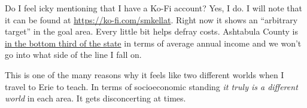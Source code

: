 Do I feel icky mentioning that I have a Ko-Fi account? Yes, I do. I will
note that it can be found at \url{https://ko-fi.com/smkellat}. Right now
it shows an ``arbitrary target'' in the goal area. Every little bit
helps defray costs. Ashtabula County is
\href{https://web.archive.org/web/20240119101143/https://www.cleveland.com/datacentral/2020/01/every-ohio-city-and-county-ranked-for-median-family-household-income-census-estimates.html}{in
the bottom third of the state} in terms of average annual income and we
won't go into what side of the line I fall on.

This is one of the many reasons why it feels like two different worlds
when I travel to Erie to teach. In terms of socioeconomic standing
\emph{it truly is a different world} in each area. It gets disconcerting
at times.
